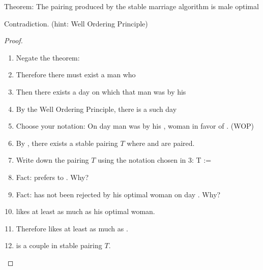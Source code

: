 \question Theorem: The pairing produced by the stable marriage 
algorithm is male optimal

\begin{solution}[0in]
Contradiction. (hint: Well Ordering Principle)
\begin{proof}  
\begin{enumerate}
\item Negate the theorem:\underline{}\newline \underline{}
\item Therefore there must exist a man who \underline{}
\item Then there exists a day on which that man was 
\underline{}  by his \newline 
\underline{}
\item By the Well Ordering Principle, there is a \underline{} 
such day
\item Choose your notation: On day \underline{} man 
\underline{} was \underline{} \newline by 
his \underline{}, woman \underline{} in favor 
of \underline{}. (WOP)
\item By \underline{}, there 
exists a stable pairing $T$ where \underline{} and 
\underline{} are paired.
\item Write down the pairing $T$ using the notation chosen in 3: \newline
	\tab T := \underline{}
\item Fact: \underline{} prefers \underline{} 
to \underline{}. \newline
\tab Why? \underline{}
\item Fact: \underline{} has not been rejected by his 
optimal woman on day \underline{}.\newline
\tab Why? \underline{} \newline \tab \tab \underline{}
\item \underline{} likes \underline{} at least as 
much as his optimal woman.
\item Therefore \underline{} likes \underline{} at 
least as much as \underline{}.
\item \underline{}  is a \underline{}   
couple in stable pairing $T$.

\end{enumerate}
\end{proof} 
\end{solution}

\clearpage